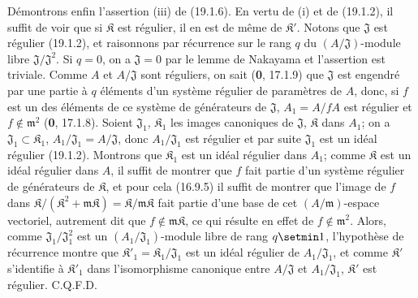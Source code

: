 Démontrons enfin l'assertion (iii) de (19.1.6). En vertu de (i) et de (19.1.2), il suffit de voir que si $\mathfrak K$ est régulier, il en est de même de $\mathfrak K'$. Notons que $\mathfrak J$ est régulier (19.1.2), et raisonnons par récurrence sur le rang $q$ du $(A/\mathfrak J)$-module libre $\mathfrak J/\mathfrak J^2$. Si $q=0$, on a $\mathfrak J=0$ par le lemme de Nakayama et l'assertion est triviale. Comme $A$ et $A/\mathfrak J$ sont réguliers, on sait (\textbf{0}, 17.1.9) que $\mathfrak J$ est engendré par une partie à $q$ éléments d'un système régulier de paramètres de $A$, donc, si $f$ est un des éléments de ce système de générateurs de $\mathfrak J$, $A_1=A/fA$ est régulier et $f\notin\mathfrak m^2$ (\textbf{0}, 17.1.8). Soient $\mathfrak J_1$, $\mathfrak K_1$ les images canoniques de $\mathfrak J$, $\mathfrak K$ dans $A_1$; on a $\mathfrak J_1\subset\mathfrak K_1$, $A_1/\mathfrak J_1=A/\mathfrak J$, donc $A_1/\mathfrak J_1$ est régulier et par suite $\mathfrak J_1$ est un idéal régulier (19.1.2). Montrons que $\mathfrak K_1$ est un idéal régulier dans $A_1$; comme $\mathfrak K$ est un idéal régulier dans $A$, il suffit de montrer que $f$ fait partie d'un système régulier de générateurs de $\mathfrak K$, et pour cela (16.9.5) il suffit de montrer que l'image de $f$ dans $\mathfrak K/(\mathfrak K^2+\mathfrak m\mathfrak K)=\mathfrak K/\mathfrak m\mathfrak K$ fait partie d'une base de cet $(A/\mathfrak m)$-espace vectoriel, autrement dit que $f\notin\mathfrak m\mathfrak K$, ce qui résulte en effet de $f\notin\mathfrak m^2$. Alors, comme $\mathfrak J_1/\mathfrak J_1^2$ est un $(A_1/\mathfrak J_1)$-module libre de rang $q\setmin 1$, l'hypothèse de récurrence montre que $\mathfrak K'_1=\mathfrak K_1/\mathfrak J_1$ est un idéal régulier de $A_1/\mathfrak J_1$, et comme $\mathfrak K'$ s'identifie à $\mathfrak K'_1$ dans l'isomorphisme canonique entre $A/\mathfrak J$ et $A_1/\mathfrak J_1$, $\mathfrak K'$ est régulier. C.Q.F.D.


